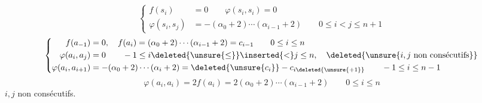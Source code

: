 \[
\left\{\begin{aligned}
f(s_i)&=0\qquad\varphi(s_i,s_i)=0\\
\varphi(s_i,s_j)&=-(\alpha_0+2)\cdots(\alpha_{i-1}+2)
\qquad0\leq i<j\leq n+1
\end{aligned}\right.
\]
\qquad
{}\qquad{}
\[
\left\{\begin{aligned}
f(a_{-1})&=0,\quad
f(a_i)=(\alpha_0+2)\cdots(\alpha_{i-1}+2)=c_{i-1}
\qquad0\leq i\leq n\\
\varphi(a_i,a_j)&=0\qquad
-1\leq i\deleted{\unsure{\leq}}\inserted{<}j\leq n,
\quad\deleted{\unsure{i,j\ \text{non consécutifs}}}\\
\varphi(a_i,a_{i+1})&=-(\alpha_0+2)\cdots(\alpha_i+2)
=\deleted{\unsure{c_i}}-c_{i\deleted{\unsure{+1}}}
\qquad-1\leq i\leq n-1
\end{aligned}\right.
\]
\[
\varphi(a_i,a_i)=2f(a_i)=2(\alpha_0+2)\cdots(\alpha_{i-1}+2)
\qquad0\leq i\leq n
\]
$i,j$ non consécutifs.

